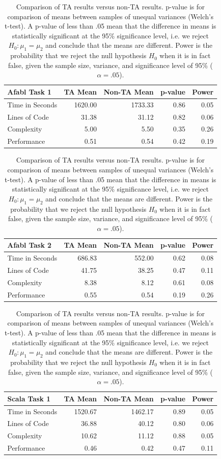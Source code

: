 \begin{center}
\begin{table}[h]
\caption{Comparison of TA results versus non-TA results. p-value is for comparison of means between samples of unequal variances (Welch's t-test\cite{welch1947generalization}). A p-value of less than .05 mean that the difference in means is statistically significant at the 95\% significance level, i.e. we reject $H_0: \mu_1 = \mu_2$ and conclude that the means are different. Power is the probability that we reject the null hypothesis $H_0$ when it is in fact false, given the sample size, variance, and significance level of 95\% ($\alpha = .05$).}

\begin{center}
\begin{tabular}{|l|r|r|r|r|}\hline
Afabl Task 1 & TA Mean & Non-TA Mean & p-value & Power\\\hline
Time in Seconds & 1620.00 & 1733.33 & 0.86 & 0.05\\
Lines of Code & 31.38 & 31.12 & 0.82 & 0.06\\
Complexity & 5.00 & 5.50 & 0.35 & 0.26\\
Performance & 0.51 & 0.54 & 0.42 & 0.19\\
\hline
\end{tabular}


\begin{tabular}{|l|r|r|r|r|}\hline
Afabl Task 2 & TA Mean & Non-TA Mean & p-value & Power\\\hline
Time in Seconds & 686.83 & 552.00 & 0.62 & 0.08\\
Lines of Code & 41.75 & 38.25 & 0.47 & 0.11\\
Complexity & 8.38 & 8.12 & 0.61 & 0.08\\
Performance & 0.55 & 0.54 & 0.19 & 0.26\\
\hline
\end{tabular}


\begin{tabular}{|l|r|r|r|r|}\hline
Scala Task 1 & TA Mean & Non-TA Mean & p-value & Power\\\hline
Time in Seconds & 1520.67 & 1462.17 & 0.89 & 0.05\\
Lines of Code & 36.88 & 40.12 & 0.80 & 0.06\\
Complexity & 10.62 & 11.12 & 0.88 & 0.05\\
Performance & 0.46 & 0.42 & 0.47 & 0.11\\
\hline
\end{tabular}



\end{center}
\end{table}
\end{center}
